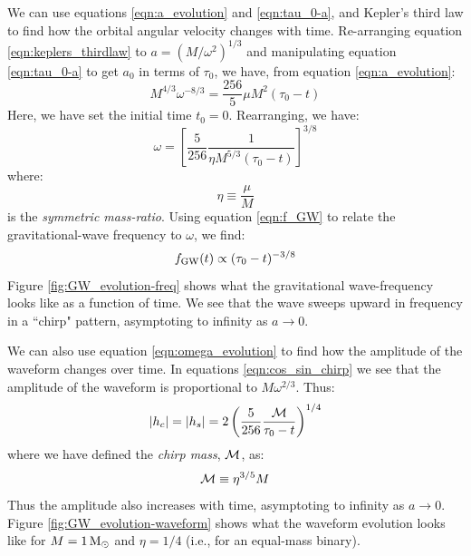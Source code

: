We can use equations \ref{eqn:a_evolution} and \ref{eqn:tau_0-a}, and Kepler's third law to find how the orbital angular velocity changes with time. Re-arranging equation \ref{eqn:keplers_thirdlaw} to $a = (M/\omega^2)^{1/3}$ and manipulating equation \ref{eqn:tau_0-a} to get $a_0$ in terms of $\tau_0$, we have, from equation \ref{eqn:a_evolution}:
\begin{equation*}
M^{4/3}\omega^{-8/3} = \frac{256}{5} \mu M^2(\tau_0 - t)
\end{equation*}
Here, we have set the initial time $t_0 = 0$. Rearranging, we have:
\begin{equation}
\label{eqn:omega_evolution}
\omega = \left[ \frac{5}{256} \frac{1}{\eta M^{5/3}(\tau_0 - t)} \right]^{3/8}
\end{equation}
where:
\begin{equation}
\label{eqn:symmetric_mass}
\eta \equiv \frac{\mu}{M}
\end{equation}
is the \emph{symmetric mass-ratio}. Using equation \ref{eqn:f_GW} to relate the gravitational-wave frequency to $\omega$, we find:
\begin{equation}
\label{eqn:f_evolution}
\fGW(t) \propto (\tau_0 - t)^{-3/8}
\end{equation}
Figure \ref{fig:GW_evolution-freq} shows what the gravitational wave-frequency looks like as a function of time. We see that the wave sweeps upward in frequency in a ``chirp" pattern, asymptoting to infinity as $a \rightarrow 0$.

We can also use equation \ref{eqn:omega_evolution} to find how the amplitude of the waveform changes over time. In equations \ref{eqn:cos_sin_chirp} we see that the amplitude of the waveform is proportional to $M\omega^{2/3}$. Thus:
\begin{equation}
\label{eqn:amp_evolution}
|h_c| = |h_s| = 2 \left( \frac{5}{256} \frac{\mchirp}{\tau_0 - t} \right)^{1/4}
\end{equation}
where we have defined the \emph{chirp mass}, $\mathcal{M}$, as:
\begin{equation}
\mathcal{M} \equiv \eta^{3/5}M
\end{equation}
Thus the amplitude also increases with time, asymptoting to infinity as $a \rightarrow 0$. Figure \ref{fig:GW_evolution-waveform} shows what the waveform evolution looks like for $M=1\,\mathrm{M_\odot}$ and $\eta = 1/4$ (i.e., for an equal-mass binary).


